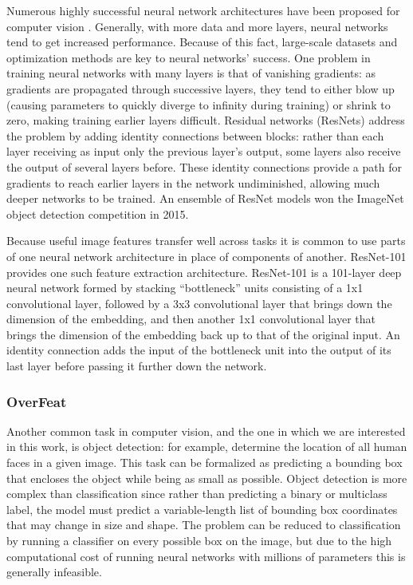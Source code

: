 \documentclass[sigconf]{acmart}
\begin{document}
Numerous highly successful neural network architectures have been proposed for computer vision \cite{Krizhevsky2012ImageNetCW,Szegedy2015,resnet}. Generally, with more data and more layers, neural networks tend to get increased performance. Because of this fact, large-scale datasets and optimization methods are key to neural networks' success. One problem in training neural networks with many layers is that of vanishing gradients: as gradients are propagated through successive layers, they tend to either blow up (causing parameters to quickly diverge to infinity during training) or shrink to zero, making training earlier layers difficult. Residual networks (ResNets) \cite{resnet} address the problem by adding identity connections between blocks: rather than each layer receiving as input only the previous layer's output, some layers also receive the output of several layers before. 
These identity connections provide a path for gradients to reach earlier layers in the network undiminished, allowing much deeper networks to be trained. 
An ensemble of ResNet models won the ImageNet object detection competition in 2015. 

Because useful image features transfer well across tasks it is common to use parts of one neural network architecture in place of components of another. 
ResNet-101 \cite{resnet} provides one such feature extraction architecture. ResNet-101 is a 101-layer deep neural network formed by stacking ``bottleneck'' units consisting of a 1x1 convolutional layer, followed by a 3x3 convolutional layer that brings down the dimension of the embedding, and then another 1x1 convolutional layer that brings the dimension of the embedding back up to that of the original input. An identity connection adds the input of the bottleneck unit into the output of its last layer before passing it further down the network.

\subsubsection{OverFeat} Another common task in computer vision, and the one in which we are interested in this work, is object detection: for example, determine the location of all human faces in a given image. 
This task can be formalized as predicting a bounding box that encloses the object while being as small as possible. 
Object detection is more complex than classification since rather than predicting a binary or multiclass label, the model must predict a variable-length list of bounding box coordinates that may change in size and shape. The problem can be reduced to classification by running a classifier on every possible box on the image, but due to the high computational cost of running neural networks with millions of parameters this is generally infeasible.
\end{document}
